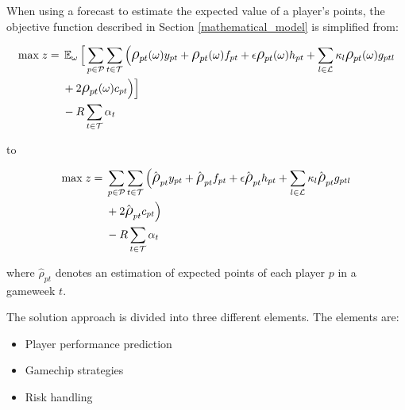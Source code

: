 \newpar


When using a forecast to estimate the expected value of a player's points, the objective function described in Section \ref{mathematical_model} is simplified from: 

\begin{equation*}
\smaller
\begin{aligned}
\text{max} \; z ={} & \EX_{\omega} \Big\lbrack\sum\limits_{p \in \mathcal{P}} \sum\limits_{t \in \mathcal{T}} \Big( \mathlarger{\rho}_{pt}(\omega)y_{pt} + \mathlarger{\rho}_{pt}(\omega)f_{pt} + \epsilon  \mathlarger{\rho}_{pt}(\omega)h_{pt} + \sum_{l \in \mathcal{L}}\kappa_{l} \mathlarger{\rho}_{pt}(\omega)g_{ptl} \\ 
&  + 2 \mathlarger{\rho}_{pt}(\omega)c_{pt} \Big)  \Big\rbrack \\ 
& - R\sum_{t \in \mathcal{T}}\alpha_{t}
\end{aligned}
\end{equation*}

to 

\begin{equation*}
\smaller
\begin{aligned}
\text{max} \; z ={} &  \sum\limits_{p \in \mathcal{P}} \sum\limits_{t \in \mathcal{T}} \Big( \hat{\mathlarger{\rho}}_{pt} y_{pt} + \hat{\mathlarger{\rho}}_{pt} f_{pt} + \epsilon  \hat{\mathlarger{\rho}}_{pt} h_{pt} + \sum_{l \in \mathcal{L}}\kappa_{l} \hat{\mathlarger{\rho}}_{pt} g_{ptl} \\ 
& + 2 \hat{\mathlarger{\rho}}_{pt} c_{pt} \Big)  \\ 
& - R\sum_{t \in \mathcal{T}}\alpha_{t}
\end{aligned}
\end{equation*}


where $\hat{\rho}_{pt}$ denotes an estimation of expected points of each player $p$ in a gameweek $t$.

\newpar

The solution approach is divided into three different elements. The elements are:

\begin{itemize}
    \item Player performance prediction
    \item Gamechip strategies
    \item Risk handling
\end{itemize}

